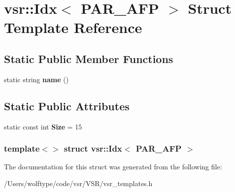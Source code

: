 \hypertarget{structvsr_1_1_idx_3_01_p_a_r___a_f_p_01_4}{\section{vsr\-:\-:Idx$<$ P\-A\-R\-\_\-\-A\-F\-P $>$ Struct Template Reference}
\label{structvsr_1_1_idx_3_01_p_a_r___a_f_p_01_4}
}
\subsection*{Static Public Member Functions}
\begin{DoxyCompactItemize}
\item 
\hypertarget{structvsr_1_1_idx_3_01_p_a_r___a_f_p_01_4_ac33f79925ed52c0f61ebe63f3f407555}{static string {\bfseries name} ()}\label{structvsr_1_1_idx_3_01_p_a_r___a_f_p_01_4_ac33f79925ed52c0f61ebe63f3f407555}

\end{DoxyCompactItemize}
\subsection*{Static Public Attributes}
\begin{DoxyCompactItemize}
\item 
\hypertarget{structvsr_1_1_idx_3_01_p_a_r___a_f_p_01_4_a20a4b9bd3a92e0a8ecb36f78c927d3df}{static const int {\bfseries Size} = 15}\label{structvsr_1_1_idx_3_01_p_a_r___a_f_p_01_4_a20a4b9bd3a92e0a8ecb36f78c927d3df}

\end{DoxyCompactItemize}
\subsubsection*{template$<$$>$ struct vsr\-::\-Idx$<$ P\-A\-R\-\_\-\-A\-F\-P $>$}



The documentation for this struct was generated from the following file\-:\begin{DoxyCompactItemize}
\item 
/\-Users/wolftype/code/vsr/\-V\-S\-R/vsr\-\_\-templates.\-h\end{DoxyCompactItemize}
